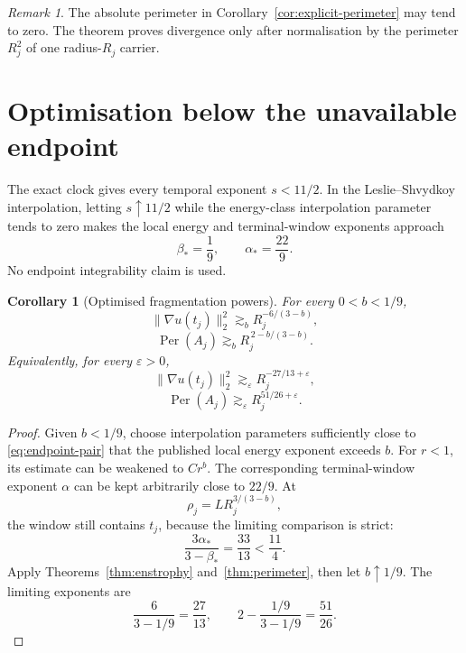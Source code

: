 \documentclass[11pt]{article}
\newtheorem{corollary}[theorem]{Corollary}
\theoremstyle{remark}
\newtheorem{remark}[theorem]{Remark}
\newcommand{\Per}{\operatorname{Per}}
\begin{document}
\begin{remark}
The absolute perimeter in Corollary~\ref{cor:explicit-perimeter} may tend
to zero.  The theorem proves divergence only after normalisation by the
perimeter \(R_j^2\) of one radius-\(R_j\) carrier.
\end{remark}

\section{Optimisation below the unavailable endpoint}

The exact clock gives every temporal exponent \(s<11/2\).  In the
Leslie--Shvydkoy interpolation, letting \(s\uparrow11/2\) while the
energy-class interpolation parameter tends to zero makes the local
energy and terminal-window exponents approach
\begin{equation}
 \label{eq:endpoint-pair}
 \beta_*=\frac19,
 \qquad
 \alpha_*=\frac{22}{9}.
\end{equation}
No endpoint integrability claim is used.

\begin{corollary}[Optimised fragmentation powers]
\label{cor:optimized}
For every \(0<b<1/9\),
\[
 \|\nabla u(t_j)\|_2^2
 \gtrsim_b R_j^{-6/(3-b)},
\]
\[
 \Per(A_j)
 \gtrsim_b R_j^{\,2-b/(3-b)}.
\]
Equivalently, for every \(\varepsilon>0\),
\begin{equation}
 \label{eq:optimized-enstrophy}
 \boxed{
 \|\nabla u(t_j)\|_2^2
 \gtrsim_\varepsilon
 R_j^{-27/13+\varepsilon},
 }
\end{equation}
\begin{equation}
 \label{eq:optimized-perimeter}
 \boxed{
 \Per(A_j)
 \gtrsim_\varepsilon
 R_j^{51/26+\varepsilon}.
 }
\end{equation}
\end{corollary}

\begin{proof}
Given \(b<1/9\), choose interpolation parameters sufficiently close to
\eqref{eq:endpoint-pair} that the published local energy exponent exceeds
\(b\).  For \(r<1\), its estimate can be weakened to \(Cr^b\).
The corresponding terminal-window exponent \(\alpha\) can be kept
arbitrarily close to \(22/9\).  At
\[
 \rho_j=L R_j^{3/(3-b)},
\]
the window still contains \(t_j\), because the limiting comparison is
strict:
\[
 \frac{3\alpha_*}{3-\beta_*}
 =\frac{33}{13}
 <\frac{11}{4}.
\]
Apply Theorems~\ref{thm:enstrophy} and~\ref{thm:perimeter}, then let
\(b\uparrow1/9\).  The limiting exponents are
\[
 \frac6{3-1/9}=\frac{27}{13},
 \qquad
 2-\frac{1/9}{3-1/9}=\frac{51}{26}.
\]
\end{proof}
\end{document}
